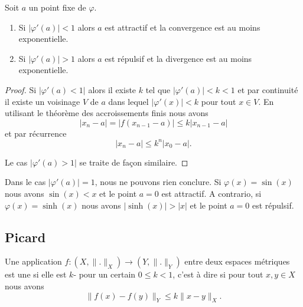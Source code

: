\begin{lemma}
    Soit \( a\) un point fixe de \( \varphi\).
    \begin{enumerate}
        \item
    Si \( | \varphi'(a) |<1\) alors \( a\) est attractif et la convergence est au moins exponentielle.
\item
    Si \( | \varphi'(a) |>1\) alors \( a\) est répulsif et la divergence est au moins exponentielle.
    \end{enumerate}
\end{lemma}

\begin{proof}
    Si \( | \varphi'(a)<1 |\) alors il existe \( k\) tel que \( | \varphi'(a) |<k<1\) et par continuité il existe un voisinage \( V\) de \( a\) dans lequel \( | \varphi'(x) |<k\) pour tout \( x\in V\). En utilisant le théorème des accroissements finis nous avons
    \begin{equation}
        | x_n-a |=\big| f(x_{n-1}-a) \big|\leq k| x_{n-1}-a |
    \end{equation}
    et par récurrence
    \begin{equation}
        | x_n-a |\leq k^n| x_0-a |.
    \end{equation}

    Le cas \( | \varphi'(a)>1 |\) se traite de façon similaire.
\end{proof}

\begin{remark}
    Dans le cas \(| \varphi'(a) |=1\), nous ne pouvons rien conclure. Si \( \varphi(x)=\sin(x)\) nous avons \( \sin(x)<x\) et le point \( a=0\) est attractif. A contrario, si \( \varphi(x)=\sinh(x)\) nous avons \( |\sinh(x)|>|x|\) et le point \( a=0\) est répulsif.
\end{remark}

\subsection{Picard}

\begin{definition}      \label{DEFooRSLCooAsWisu}
    Une application \( f\colon (X,\| . \|_X)\to (Y,\| . \|_Y)\) entre deux espaces métriques est une  si elle est \( k\)- pour un certain \( 0\leq k<1\), c'est à dire si pour tout \( x,y\in X\) nous avons
    \begin{equation}
        \| f(x)-f(y) \|_Y\leq k\| x-y \|_{X}.
    \end{equation}
\end{definition}

